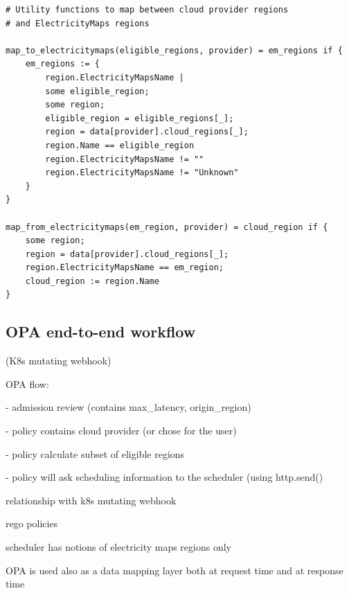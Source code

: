 \begin{lstlisting}[language=Rego, caption=Rego data mapping, label=lst:rego_data_mapping]
# Utility functions to map between cloud provider regions 
# and ElectricityMaps regions

map_to_electricitymaps(eligible_regions, provider) = em_regions if {
    em_regions := {
        region.ElectricityMapsName |                             
        some eligible_region;                       
        some region;                                
        eligible_region = eligible_regions[_];      
        region = data[provider].cloud_regions[_];   
        region.Name == eligible_region             
        region.ElectricityMapsName != ""            
        region.ElectricityMapsName != "Unknown"
    }
}

map_from_electricitymaps(em_region, provider) = cloud_region if {
    some region;                              
    region = data[provider].cloud_regions[_];   
    region.ElectricityMapsName == em_region;    
    cloud_region := region.Name 
}

\end{lstlisting}

\subsection{OPA end-to-end workflow}

 (K8s mutating webhook)

OPA flow:

- admission review (contains max\_latency, origin\_region)

- policy contains cloud provider (or chose for the user)

- policy calculate subset of eligible regions

- policy will ask scheduling information to the scheduler (using http.send()










relationship with k8s mutating webhook

rego policies


scheduler has notions of 
electricity maps regions only

OPA is used also as a data mapping layer
both at request time
and at response time


